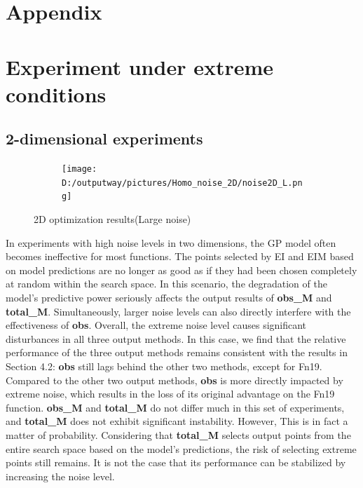 \documentclass{article}
\begin{document}

\clearpage

{\centering\section*{Appendix}}
\appendix
\section{Experiment under extreme conditions}
\subsection{2-dimensional experiments}
\begin{figure}[H]
    \centering
    \begin{subfigure}[t]{.96\linewidth}
        \centering
        \texttt{[image: D:/outputway/pictures/Homo\_noise\_2D/noise2D\_L.png]}
    \end{subfigure}
    \caption{2D optimization results(Large noise)}
    \label{Fig7}
\end{figure}

\hspace{2em}In experiments with high noise levels in two dimensions, the GP model often becomes ineffective for most functions. The points selected by EI and EIM based on model predictions are no longer as good as if they had been chosen completely at random within the search space. In this scenario, the degradation of the model's predictive power seriously affects the output results of \textbf{obs\_M} and \textbf{total\_M}. Simultaneously, larger noise levels can also directly interfere with the effectiveness of \textbf{obs}. Overall, the extreme noise level causes significant disturbances in all three output methods. In this case, we find that the relative performance of the three output methods remains consistent with the results in Section 4.2: \textbf{obs} still lags behind the other two methods, except for Fn19. Compared to the other two output methods, \textbf{obs} is more directly impacted by extreme noise, which results in the loss of its original advantage on the Fn19 function. \textbf{obs\_M} and \textbf{total\_M} do not differ much in this set of experiments, and \textbf{total\_M} does not exhibit significant instability. However, This is in fact a matter of probability. Considering that \textbf{total\_M} selects output points from the entire search space based on the model's predictions, the risk of selecting extreme points still remains. It is not the case that its performance can be stabilized by increasing the noise level.
\end{document}
